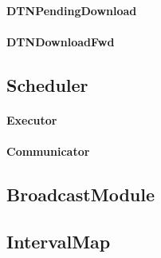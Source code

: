 \paragraph{DTNPendingDownload}
\paragraph{DTNDownloadFwd}

\subsection{Scheduler}
\paragraph{Executor}
\paragraph{Communicator}

\subsection{BroadcastModule}

\subsection{IntervalMap}
 

